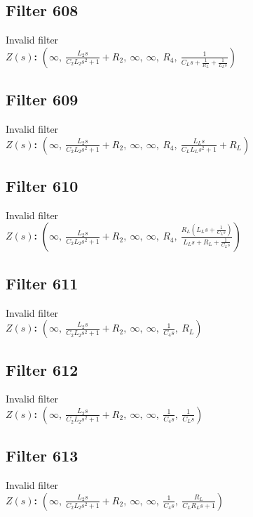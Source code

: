 \documentclass{article}
\begin{document}
\subsection*{Filter 608}
Invalid filter \\ 
\textbf{$Z(s)$:} $\left( \infty, \  \frac{L_{2} s}{C_{2} L_{2} s^{2} + 1} + R_{2}, \  \infty, \  \infty, \  R_{4}, \  \frac{1}{C_{L} s + \frac{1}{R_{L}} + \frac{1}{L_{L} s}}\right)$ \\ 
\subsection*{Filter 609}
Invalid filter \\ 
\textbf{$Z(s)$:} $\left( \infty, \  \frac{L_{2} s}{C_{2} L_{2} s^{2} + 1} + R_{2}, \  \infty, \  \infty, \  R_{4}, \  \frac{L_{L} s}{C_{L} L_{L} s^{2} + 1} + R_{L}\right)$ \\ 
\subsection*{Filter 610}
Invalid filter \\ 
\textbf{$Z(s)$:} $\left( \infty, \  \frac{L_{2} s}{C_{2} L_{2} s^{2} + 1} + R_{2}, \  \infty, \  \infty, \  R_{4}, \  \frac{R_{L} \left(L_{L} s + \frac{1}{C_{L} s}\right)}{L_{L} s + R_{L} + \frac{1}{C_{L} s}}\right)$ \\ 
\subsection*{Filter 611}
Invalid filter \\ 
\textbf{$Z(s)$:} $\left( \infty, \  \frac{L_{2} s}{C_{2} L_{2} s^{2} + 1} + R_{2}, \  \infty, \  \infty, \  \frac{1}{C_{4} s}, \  R_{L}\right)$ \\ 
\subsection*{Filter 612}
Invalid filter \\ 
\textbf{$Z(s)$:} $\left( \infty, \  \frac{L_{2} s}{C_{2} L_{2} s^{2} + 1} + R_{2}, \  \infty, \  \infty, \  \frac{1}{C_{4} s}, \  \frac{1}{C_{L} s}\right)$ \\ 
\subsection*{Filter 613}
Invalid filter \\ 
\textbf{$Z(s)$:} $\left( \infty, \  \frac{L_{2} s}{C_{2} L_{2} s^{2} + 1} + R_{2}, \  \infty, \  \infty, \  \frac{1}{C_{4} s}, \  \frac{R_{L}}{C_{L} R_{L} s + 1}\right)$ \\ 
\end{document}

